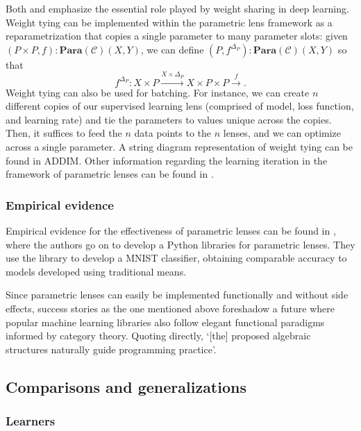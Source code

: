 \documentclass[12pt,a4paper,openright,twoside]{report}
\theoremstyle{plain}
\theoremstyle{definition}
\begin{document}
Both \cite{cruttwell2022categorical} and \cite{gavranovic2024fundamental} emphasize the essential role played by weight sharing in deep learning. Weight tying can be implemented within the parametric lens framework as a reparametrization that copies a single parameter to many parameter slots: given $(P \times P, f): \mathbf{Para}(\mathcal{C})(X,Y)$, we can define $(P, f^{\Delta_P}): \mathbf{Para}(\mathcal{C})(X,Y)$ so that
\[f^{\Delta_P}: X \times P \stackrel{X \times \Delta_P}{\longrightarrow} X \times P \times P \stackrel{f}{\longrightarrow}.\]
Weight tying can also be used for batching. For instance, we can create $n$ different copies of our supervised learning lens (comprised of model, loss function, and learning rate) and tie the parameters to values unique across the copies. Then, it suffices to feed the $n$ data points to the $n$ lenses, and we can optimize across a single parameter. A string diagram representation of weight tying can be found in ADDIM. Other information regarding the learning iteration in the framework of parametric lenses can be found in \cite{cruttwell2022categorical}.


\subsubsection{Empirical evidence}

Empirical evidence for the effectiveness of parametric lenses can be found in \cite{cruttwell2022categorical}, where the authors go on to develop a Python libraries for parametric lenses. They use the library to develop a MNIST classifier, obtaining comparable accuracy to models developed using traditional means. 


Since parametric lenses can easily be implemented functionally and without side effects, success stories as the one mentioned above foreshadow a future where popular machine learning libraries also follow elegant functional paradigms informed by category theory. Quoting  \cite{cruttwell2022categorical} directly, \lq[the] proposed algebraic structures naturally guide programming practice\rq.


\subsection{Comparisons and generalizations}

\subsubsection{Learners}
\end{document}
